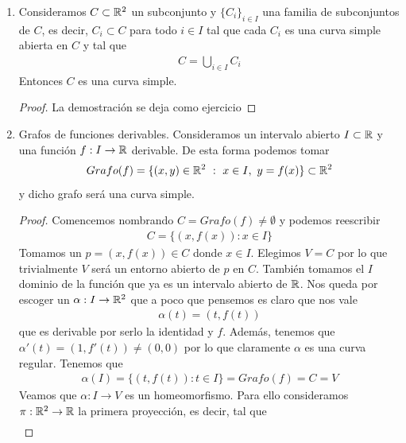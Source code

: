 \begin{ejemplo}
\begin{enumerate}
        \item\label{ej:union} Consideramos $C\subset \mathbb{R}^2$ un subconjunto y $\{C_i\}_{i\in I}$ una familia de subconjuntos de $C$, es decir, $C_i\subset C$ para todo $i\in I$ tal que cada $C_i$ es una curva simple abierta en $C$ y tal que 
        \begin{gather*}
            C = \bigcup_{i\in I} C_i
        \end{gather*}
        Entonces $C$ es una curva simple.
        \begin{proof}
            La demostración se deja como ejercicio
        \end{proof}

        \item\label{ej:grafo} Grafos de funciones derivables. Consideramos un intervalo abierto $I\subset \mathbb{R}$ y una función $f: I\to \mathbb{R}$ derivable. De esta forma podemos tomar
        \begin{gather*}
            Grafo(f) = \{(x,y) \in \mathbb{R}^2 \ : \ x\in I,\ y=f(x)\} \subset \mathbb{R}^2
        \end{gather*}
        y dicho grafo será una curva simple.
        \begin{proof}
            Comencemos nombrando $C=Grafo(f)\neq \emptyset$ y podemos reescribir
            \begin{gather*}
                C = \{(x,f(x)) : x\in I\}
            \end{gather*}
            Tomamos un $p=(x,f(x))\in C$ donde $x\in I$. Elegimos $V=C$ por lo que trivialmente $V$ será un entorno abierto de $p$ en $C$. También tomamos el $I$ dominio de la función que ya es un intervalo abierto de $\mathbb{R}$. Nos queda por escoger un $\alpha:I \to \mathbb{R}^2$ que a poco que pensemos es claro que nos vale
            \begin{gather*}
                \alpha(t) = (t,f(t))
            \end{gather*}  
            que es derivable por serlo la identidad y $f$. Además, tenemos que $\alpha'(t) = (1, f'(t)) \neq (0,0)$ por lo que claramente $\alpha$ es una curva regular. Tenemos que
            \begin{gather*}
                \alpha(I) = \{(t, f(t)) : t\in I\} = Grafo(f) = C = V
            \end{gather*}
            Veamos que $\alpha : I \to V$ es un homeomorfismo. Para ello consideramos $\pi:\mathbb{R}^2 \to \mathbb{R}$ la primera proyección, es decir, tal que
            \begin{gather*}

\end{gather*}
\end{proof}
\end{enumerate}
\end{ejemplo}
